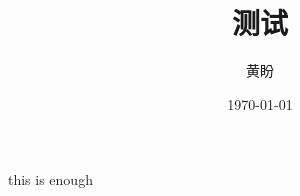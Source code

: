 \documentclass[utf8]{ctexart}
\title{测试}
\author{黄盼}
\date{\today}
\begin{document}
	\maketitle
	this is enough
\end{document}
